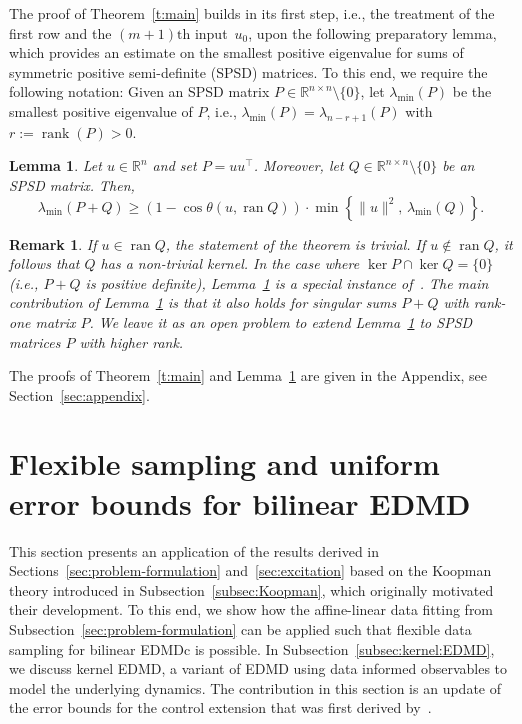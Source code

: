 \documentclass[a4paper, reqno]{amsart}
\newcommand{\R}{\ensuremath{\mathbb R}}
\newtheorem{lemma}[theorem]{Lemma}
\newtheorem{remark}[theorem]{Remark}
\begin{document}
The proof of Theorem~\ref{t:main} builds in its first step, i.e., the treatment of the first row and the $(m+1)\text{th}$ input~$u_0$, upon the following preparatory lemma, which provides an estimate on the smallest positive eigenvalue for sums of symmetric positive semi-definite (SPSD) matrices. 
To this end, we require the following notation: Given an SPSD matrix $P\in\R^{n\times n} \setminus\{0\}$, 
let $\lambda_\mathrm{min}(P)$ be the smallest positive eigenvalue of $P$, i.e., $\lambda_\mathrm{min}(P) = \lambda_{n-r+1}(P)$ with $r:=\operatorname{rank}(P)>0$.
\begin{lemma}\label{t:kaur_ext}
    Let $u\in\R^n$ and set $P = uu^\top$. Moreover, let $Q\in\R^{n\times n}\setminus\{0\}$ be an SPSD matrix. Then,
    \begin{equation}\label{e:kaur_ext}
    \lambda_\mathrm{min}(P+Q) \geq (1 - \cos\theta(u,\operatorname{ran}Q))\cdot\min\!\left\lbrace \|u\|^2,\,\lambda_{\min}(Q)\right\rbrace.
    \end{equation}
\end{lemma}
\begin{remark}\label{r:kaur}
If $u\in\operatorname{ran}Q$, the statement of the theorem is trivial. If $u\notin\operatorname{ran}Q$, it follows that $Q$ has a non-trivial kernel. In the case where $\ker P\cap\ker Q = \{0\}$ (i.e., $P+Q$ is positive definite), Lemma~\ref{t:kaur_ext} is a special instance of~\cite[Theorem 3.1]{kaur23}. The main contribution of Lemma~\ref{t:kaur_ext} is that it also holds for singular sums $P+Q$ with rank-one matrix $P$. We leave it as an open problem to extend Lemma~\ref{t:kaur_ext} to SPSD matrices $P$ with higher rank.
\end{remark}
The proofs of Theorem~\ref{t:main} and Lemma~\ref{t:kaur_ext} are given in the Appendix, see Section~\ref{sec:appendix}. 













    \section{Flexible sampling and uniform error bounds for bilinear EDMD}
    \label{sec:Koopman}


This section presents an application of the results derived in Sections~\ref{sec:problem-formulation} and~\ref{sec:excitation} based on the Koopman theory introduced in Subsection~\ref{subsec:Koopman}, 
which originally motivated their development. 
To this end, 
we show how the affine-linear data fitting from Subsection~\ref{sec:problem-formulation} can be applied such that flexible data sampling for bilinear EDMDc is possible.  
In Subsection~\ref{subsec:kernel:EDMD}, we discuss kernel EDMD, a variant of EDMD using data informed observables to model the underlying dynamics. The contribution in this section is an update of the error bounds for the control extension that was first derived by~\cite{BoldPhil24}.
\end{document}
